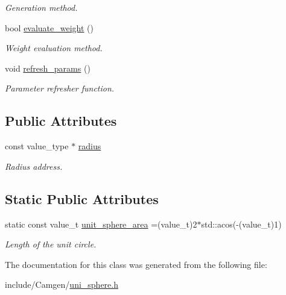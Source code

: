 \begin{DoxyCompactItemize}
\begin{DoxyCompactList}\small\item\em Generation method. \end{DoxyCompactList}\item 
\hypertarget{a00550_a263f0a0689c416c7e19df4d0e2ba816c}{bool \hyperlink{a00550_a263f0a0689c416c7e19df4d0e2ba816c}{evaluate\-\_\-weight} ()}\label{a00550_a263f0a0689c416c7e19df4d0e2ba816c}

\begin{DoxyCompactList}\small\item\em Weight evaluation method. \end{DoxyCompactList}\item 
\hypertarget{a00550_a687a2c0c27688eb85197baa7aec202f7}{void \hyperlink{a00550_a687a2c0c27688eb85197baa7aec202f7}{refresh\-\_\-params} ()}\label{a00550_a687a2c0c27688eb85197baa7aec202f7}

\begin{DoxyCompactList}\small\item\em Parameter refresher function. \end{DoxyCompactList}\end{DoxyCompactItemize}
\subsection*{Public Attributes}
\begin{DoxyCompactItemize}
\item 
\hypertarget{a00550_aaeed2171b5d9484e1bbca66bcbefec7d}{const value\-\_\-type $\ast$ \hyperlink{a00550_aaeed2171b5d9484e1bbca66bcbefec7d}{radius}}\label{a00550_aaeed2171b5d9484e1bbca66bcbefec7d}

\begin{DoxyCompactList}\small\item\em Radius address. \end{DoxyCompactList}\end{DoxyCompactItemize}
\subsection*{Static Public Attributes}
\begin{DoxyCompactItemize}
\item 
\hypertarget{a00550_acdc4fe773256e346168ba4ff630c00f1}{static const value\-\_\-t \hyperlink{a00550_acdc4fe773256e346168ba4ff630c00f1}{unit\-\_\-sphere\-\_\-area} =(value\-\_\-t)2$\ast$std\-::acos(-\/(value\-\_\-t)1)}\label{a00550_acdc4fe773256e346168ba4ff630c00f1}

\begin{DoxyCompactList}\small\item\em Length of the unit circle. \end{DoxyCompactList}\end{DoxyCompactItemize}


The documentation for this class was generated from the following file\-:\begin{DoxyCompactItemize}
\item 
include/\-Camgen/\hyperlink{a00797}{uni\-\_\-sphere.\-h}\end{DoxyCompactItemize}
